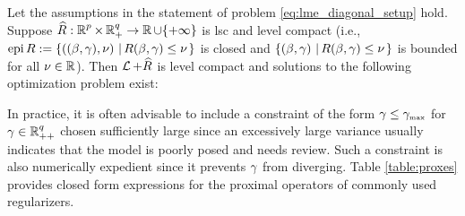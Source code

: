 \begin{theorem}

\label{thm:basic existence2}
Let the assumptions in the statement of problem \eqref{eq:lme_diagonal_setup} hold.
Suppose ${\widehat R}:\operatorname{\mathbb{R}}^p\times\operatorname{\mathbb{R}}^q_+\rightarrow \operatorname{\mathbb{R}}\cup\{+\infty\}$ 
is lsc and level compact (i.e., $\operatorname{epi}{R}:=\left\{((\beta,\gamma),\nu)\,\left|\,R(\beta,\gamma)\le\nu\right.\right\}$ is closed
and $\left\{(\beta,\gamma)\,\left|\,R(\beta,\gamma)\le\nu\right.\right\}$ is bounded for all $\nu\in\operatorname{\mathbb{R}}$).
Then $\operatorname{\mathcal{L}}+{\widehat R}$ is level compact and solutions to
the following optimization problem exist:
\end{theorem}

In practice, it is often advisable to include a constraint of the form 
$\gamma\le{\gamma_{\mbox{\tiny max}}}$ for $\gamma\in\operatorname{\mathbb{R}}^q_{++}$ chosen
sufficiently large since an excessively large variance usually indicates 
that the model is poorly posed and needs review. 
Such a constraint is also numerically expedient since it prevents $\gamma$ from diverging. Table \ref{table:proxes} provides closed form expressions for the proximal operators 
of commonly used regularizers. 


